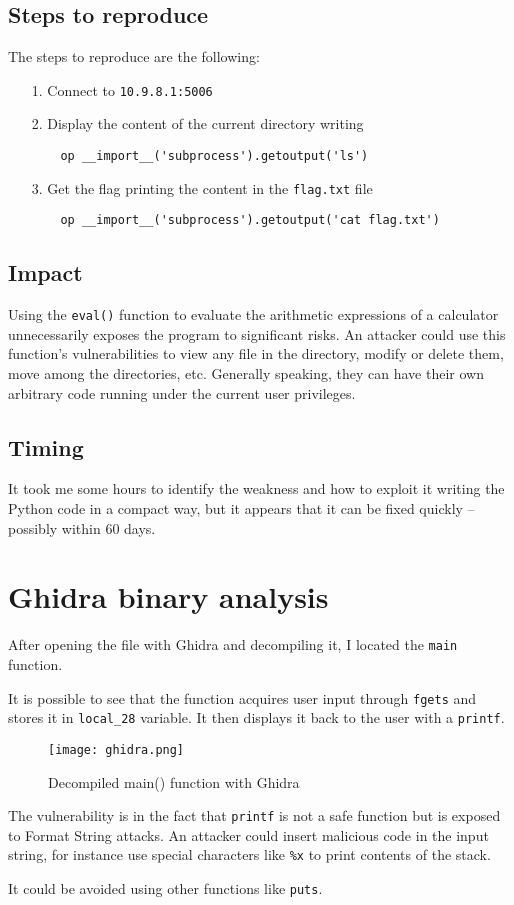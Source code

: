 \documentclass{article}
\begin{document}
\subsection{Steps to reproduce}
The steps to reproduce are the following:
\begin{itemize}
    \item[1.] Connect to \texttt{10.9.8.1:5006}
    \item[2.] Display the content of the current directory writing
    \begin{verbatim}
    op __import__('subprocess').getoutput('ls')
    \end{verbatim}
    \item[3.] Get the flag printing the content in the \texttt{flag.txt} file
    \begin{verbatim}
    op __import__('subprocess').getoutput('cat flag.txt')
    \end{verbatim}
\end{itemize}

\subsection{Impact}
Using the \texttt{eval()} function to evaluate the arithmetic expressions of a calculator unnecessarily exposes the program to significant risks.
An attacker could use this function's vulnerabilities to view any file in the directory, modify or delete them, move among the directories, etc.
Generally speaking, they can have their own arbitrary code running under the current user privileges.

\subsection{Timing}
It took me some hours to identify the weakness and how to exploit it writing the Python code in a compact way, but it appears that it can be fixed quickly – possibly within 60 days.

\section{Ghidra binary analysis}
After opening the file with Ghidra and decompiling it, I located the \texttt{main} function.

It is possible to see that the function acquires user input through \texttt{fgets} and stores it in \texttt{local\_28} variable. It then displays it back to the user with a \texttt{printf}.

\begin{figure}[H]
    \centering
    \texttt{[image: ghidra.png]}
    \caption{Decompiled main() function with Ghidra}
    \label{fig:Ghidra}
\end{figure}

The vulnerability is in the fact that \texttt{printf} is not a safe function but is exposed to Format String attacks. An attacker could  insert malicious code in the input string, for instance use special characters like \texttt{\%x} to print contents of the stack.

It could be avoided using other functions like \texttt{puts}.
\end{document}
